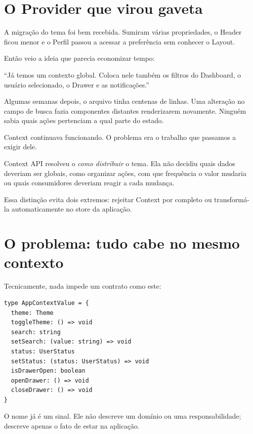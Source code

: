 \label{chap:context-api}

\section{O Provider que virou gaveta}

\begin{historia}
A migração do tema foi bem recebida. Sumiram várias propriedades, o Header ficou
menor e o Perfil passou a acessar a preferência sem conhecer o Layout.

Então veio a ideia que parecia economizar tempo:

``Já temos um contexto global. Coloca nele também os filtros do Dashboard, o
usuário selecionado, o Drawer e as notificações.''

Algumas semanas depois, o arquivo tinha centenas de linhas. Uma alteração no
campo de busca fazia componentes distantes renderizarem novamente. Ninguém sabia
quais ações pertenciam a qual parte do estado.

Context continuava funcionando. O problema era o trabalho que passamos a exigir
dele.
\end{historia}

Context API resolveu o \emph{como distribuir} o tema. Ela não decidiu quais
dados deveriam ser globais, como organizar ações, com que frequência o valor
mudaria ou quais consumidores deveriam reagir a cada mudança.

Essa distinção evita dois extremos: rejeitar Context por completo ou transformá-la
automaticamente no store da aplicação.

\section{O problema: tudo cabe no mesmo contexto}

Tecnicamente, nada impede um contrato como este:

\begin{lstlisting}[caption={Um contexto que começou a acumular responsabilidades.}]
type AppContextValue = {
  theme: Theme
  toggleTheme: () => void
  search: string
  setSearch: (value: string) => void
  status: UserStatus
  setStatus: (status: UserStatus) => void
  isDrawerOpen: boolean
  openDrawer: () => void
  closeDrawer: () => void
}
\end{lstlisting}

O nome  já é um sinal. Ele não descreve um domínio ou uma
responsabilidade; descreve apenas o fato de estar na aplicação.

